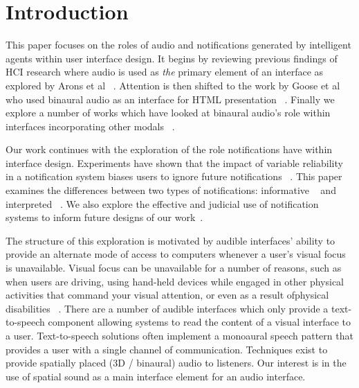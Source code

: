 \newpage                                                 \chapter{Introduction}
\renewcommand{\thepage }{\arabic{page}}                    \setcounter{page}{1}

This paper focuses on the roles of audio and notifications generated by
intelligent agents within user interface design. It begins by reviewing previous
findings of HCI research where audio is used as \textit{the} primary element 
of an interface as explored by Arons et al ~\cite{arons1991hyperspeech}. Attention is then 
shifted to the work by Goose et al who used binaural audio as an interface for 
HTML presentation ~\cite{goose19993dAudio}. Finally we explore a number of works
which have looked at binaural audio's role within interfaces incorporating other
modals ~\cite{ yu2006novel, marentakis2004study}. 

Our work continues with the exploration of the role notifications have within 
interface design. Experiments have shown that the impact of variable reliability
in a notification system biases users to ignore future notifications
~\cite{leetiernan2001effective}. This paper examines the  differences between 
two types of notifications: informative ~\cite{maltz2000cue} and interpreted
~\cite{horvitz1999principles}. We also explore the effective and judicial use of
notification systems to inform future designs of our work~\cite{cutrell2001notification}.

The structure of this exploration is motivated by audible interfaces' ability to
provide an alternate mode of access to computers whenever a user's visual focus
is unavailable. Visual focus can be unavailable for a number of reasons, such as
when users are driving, using hand-held devices while engaged in other physical
activities that command your visual attention, or even as a result ofphysical 
disabilities ~\cite{michelis2008disappearing}. There are a number of audible 
interfaces which only provide a text-to-speech component allowing systems
to read the content of a visual interface to a user.  Text-to-speech solutions 
often implement a monoaural speech pattern that provides a user with a single 
channel of communication. Techniques exist to provide spatially placed (3D /
binaural) audio to listeners.  Our interest is in the use of spatial sound as
a main interface element for an audio interface. 

